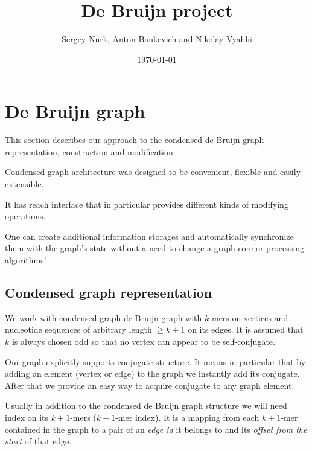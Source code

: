 \documentclass[12pt]{article}
\title{De Bruijn project}
\author{Sergey Nurk, Anton Bankevich and Nikolay Vyahhi}
\date{\today}
\newcommand{\dbg}{de Bruijn graph}
\begin{document}
\maketitle

\tableofcontents

\section{De Bruijn graph}

This section describes our approach to the condensed \dbg{} representation, construction and modification.

Condensed graph architecture was designed to be convenient, flexible and easily extensible. 

It has reach interface that in particular provides different kinds of modifying operations. 

One can create additional information storages and automatically synchronize them with the graph's state without a need to change a graph core or processing algorithms!


\subsection{Condensed graph representation}

We work with condensed graph \dbg{} with $k$-mers on vertices and nucleotide sequences of arbitrary length $\geq k + 1$ on its edges. It is assumed that $k$ is always chosen odd so that no vertex can appear to be self-conjugate.

Our graph explicitly supports conjugate structure. It means in particular that by adding an element (vertex or edge) to the graph we instantly add its conjugate. After that we provide an easy way to acquire conjugate to any graph element.

Usually in addition to the condensed \dbg{} structure we will need index on its $k+1$-mers ($k+1$-mer index). It is a mapping from each $k+1$-mer contained in the graph to a pair of an \emph{edge id} it belongs to and its \emph{offset from the start} of that edge. 
\end{document}
